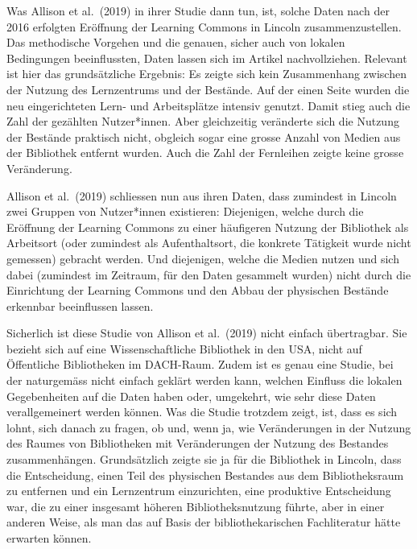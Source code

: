 \documentclass[a4paper,
fontsize=11pt,
oneside,
numbers=noperiodatend,
parskip=half-,
bibliography=totoc,
final
]{scrartcl}
\begin{document}
Was Allison et al.~(2019) in ihrer Studie dann tun, ist, solche Daten
nach der 2016 erfolgten Eröffnung der Learning Commons in Lincoln
zusammenzustellen. Das methodische Vorgehen und die genauen, sicher auch
von lokalen Bedingungen beeinflussten, Daten lassen sich im Artikel
nachvollziehen. Relevant ist hier das grundsätzliche Ergebnis: Es zeigte
sich kein Zusammenhang zwischen der Nutzung des Lernzentrums und der
Bestände. Auf der einen Seite wurden die neu eingerichteten Lern- und
Arbeitsplätze intensiv genutzt. Damit stieg auch die Zahl der gezählten
Nutzer*innen. Aber gleichzeitig veränderte sich die Nutzung der Bestände
praktisch nicht, obgleich sogar eine grosse Anzahl von Medien aus der
Bibliothek entfernt wurden. Auch die Zahl der Fernleihen zeigte keine
grosse Veränderung.

Allison et al.~(2019) schliessen nun aus ihren Daten, dass zumindest in
Lincoln zwei Gruppen von Nutzer*innen existieren: Diejenigen, welche
durch die Eröffnung der Learning Commons zu einer häufigeren Nutzung der
Bibliothek als Arbeitsort (oder zumindest als Aufenthaltsort, die
konkrete Tätigkeit wurde nicht gemessen) gebracht werden. Und
diejenigen, welche die Medien nutzen und sich dabei (zumindest im
Zeitraum, für den Daten gesammelt wurden) nicht durch die Einrichtung
der Learning Commons und den Abbau der physischen Bestände erkennbar
beeinflussen lassen.

Sicherlich ist diese Studie von Allison et al.~(2019) nicht einfach
übertragbar. Sie bezieht sich auf eine Wissenschaftliche Bibliothek in
den USA, nicht auf Öffentliche Bibliotheken im DACH-Raum. Zudem ist es
genau eine Studie, bei der naturgemäss nicht einfach geklärt werden
kann, welchen Einfluss die lokalen Gegebenheiten auf die Daten haben
oder, umgekehrt, wie sehr diese Daten verallgemeinert werden können. Was
die Studie trotzdem zeigt, ist, dass es sich lohnt, sich danach zu
fragen, ob und, wenn ja, wie Veränderungen in der Nutzung des Raumes von
Bibliotheken mit Veränderungen der Nutzung des Bestandes zusammenhängen.
Grundsätzlich zeigte sie ja für die Bibliothek in Lincoln, dass die
Entscheidung, einen Teil des physischen Bestandes aus dem
Bibliotheksraum zu entfernen und ein Lernzentrum einzurichten, eine
produktive Entscheidung war, die zu einer insgesamt höheren
Bibliotheksnutzung führte, aber in einer anderen Weise, als man das auf
Basis der bibliothekarischen Fachliteratur hätte erwarten können.
\end{document}
